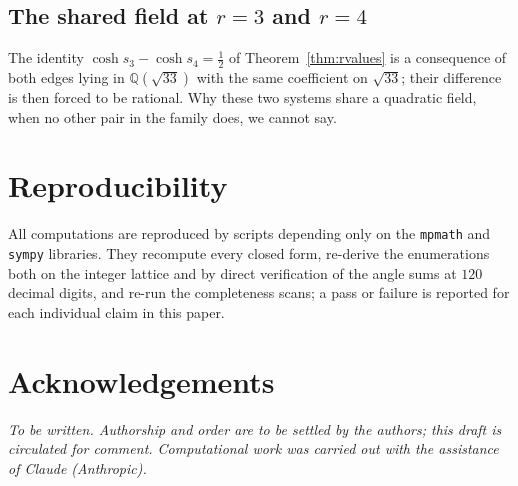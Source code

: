 \documentclass[11pt,a4paper]{article}
\theoremstyle{plain}
\theoremstyle{definition}
\theoremstyle{remark}
\newcommand{\QQ}{\mathbb{Q}}
\begin{document}
\subsection*{The shared field at \texorpdfstring{$r=3$}{r=3} and \texorpdfstring{$r=4$}{r=4}}
The identity $\cosh s_3-\cosh s_4=\tfrac12$ of Theorem~\ref{thm:rvalues} is a
consequence of both edges lying in $\QQ(\sqrt{33})$ with the same coefficient on
$\sqrt{33}$; their difference is then forced to be rational. Why these two
systems share a quadratic field, when no other pair in the family does, we cannot
say.

\section*{Reproducibility}

All computations are reproduced by scripts depending only on the
\texttt{mpmath} and \texttt{sympy} libraries. They recompute every closed form,
re-derive the enumerations both on the integer lattice and by direct
verification of the angle sums at $120$ decimal digits, and re-run the
completeness scans; a pass or failure is reported for each individual claim in
this paper.

\section*{Acknowledgements}

\emph{To be written. Authorship and order are to be settled by the authors; this
draft is circulated for comment. Computational work was carried out with the
assistance of Claude (Anthropic).}
\end{document}
